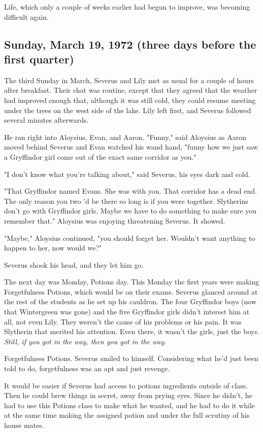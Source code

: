 Life, which only a couple of weeks earlier had begun to improve, was becoming difficult again.

\subsection{Sunday, March 19, 1972 (three days before the first quarter)}

The third Sunday in March, Severus and Lily met as usual for a couple of hours after breakfast. Their chat was routine, except that they agreed that the weather had improved enough that, although it was still cold, they could resume meeting under the trees on the west side of the lake. Lily left first, and Severus followed several minutes afterwards.

He ran right into Aloysius, Evan, and Aaron. "Funny," said Aloysius as Aaron moved behind Severus and Evan watched his wand hand, "funny how we just saw a Gryffindor girl come out of the exact same corridor as you."

"I don't know what you're talking about," said Severus, his eyes dark and cold.

"That Gryffindor named Evans. She was with you. That corridor has a dead end. The only reason you two 'd be there so long is if you were together. Slytherins don't go with Gryffindor girls. Maybe we have to do something to make sure you remember that." Aloysius was enjoying threatening Severus. It showed.

"Maybe," Aloysius continued, "you should forget her. Wouldn't want anything to happen to her, now would we?"

Severus shook his head, and they let him go.

The next day was Monday, Potions day. This Monday the first years were making Forgetfulness Potions, which would be on their exams. Severus glanced around at the rest of the students as he set up his cauldron. The four Gryffindor boys (now that Wintergreen was gone) and the five Gryffindor girls didn't interest him at all, not even Lily. They weren't the cause of his problems or his pain. It was Slytherin that merited his attention. Even there, it wasn't the girls, just the boys. \emph{Still, if you got in the way, then you got in the way.}

Forgetfulness Potions. Severus smiled to himself. Considering what he'd just been told to do, forgetfulness was an apt and just revenge.

It would be easier if Severus had access to potions ingredients outside of class. Then he could brew things in secret, away from prying eyes. Since he didn't, he had to use this Potions class to make what he wanted, and he had to do it while at the same time making the assigned potion and under the full scrutiny of his house mates.

